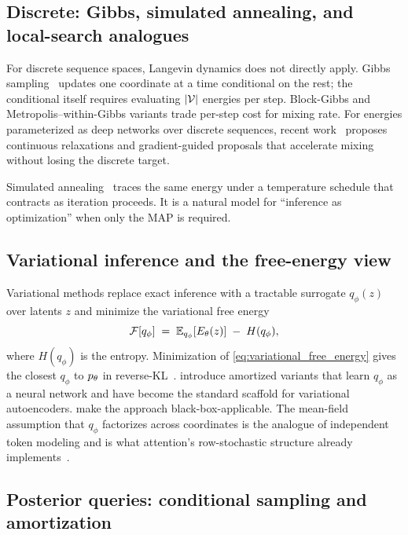 \subsection{Discrete: Gibbs, simulated annealing, and local-search analogues}
\label{ssec:gibbs}

For discrete sequence spaces, Langevin dynamics does not directly apply.
Gibbs sampling~\citep{geman1984stochastic} updates one coordinate at a time conditional on the rest;
the conditional itself requires evaluating $|\mathcal{V}|$ energies per step.
Block-Gibbs and Metropolis--within-Gibbs variants trade per-step cost for mixing rate.
For energies parameterized as deep networks over discrete sequences, recent work~\citep{grathwohl2021ono,emami2024discrete} proposes continuous relaxations and gradient-guided proposals that accelerate mixing without losing the discrete target.

Simulated annealing~\citep{kirkpatrick1983optimization} traces the same energy under a temperature schedule that contracts as iteration proceeds.
It is a natural model for ``inference as optimization'' when only the MAP is required.

\subsection{Variational inference and the free-energy view}
\label{ssec:variational}

Variational methods replace exact inference with a tractable surrogate $q_\phi(z)$ over latents $z$ and minimize the variational free energy
\begin{equation}
  \mathcal{F}[q_\phi] \;=\; \mathbb{E}_{q_\phi}\!\left[E_\theta(z)\right] \;-\; H(q_\phi),
  \label{eq:variational_free_energy}
\end{equation}
where $H(q_\phi)$ is the entropy.
Minimization of \cref{eq:variational_free_energy} gives the closest $q_\phi$ to $p_\theta$ in reverse-KL~\citep{wainwright2008graphical}.
\citet{rezende2014stochastic,kingma2014auto} introduce amortized variants that learn $q_\phi$ as a neural network and have become the standard scaffold for variational autoencoders.
\citet{ranganath2014black} make the approach black-box-applicable.
The mean-field assumption that $q_\phi$ factorizes across coordinates is the analogue of independent token modeling and is what attention's row-stochastic structure already implements~\citep{ramsauer2020hopfield}.

\subsection{Posterior queries: conditional sampling and amortization}
\label{ssec:conditional}

